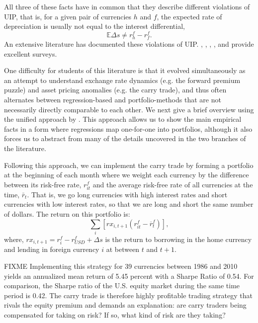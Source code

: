 \documentclass{ar-1col}
\begin{document}
All three of these facts have in common that they describe different violations of UIP, that is, for a given pair of currencies $h$ and $f$, the expected rate of depreciation is usually not equal to the interest differential, $$\mathbb{E}\Delta s \neq r^f_h-r^f_f .$$ An extensive literature has documented these violations of UIP. \citet{Hodrick1987}, \citet{FrootThaler1990}, \citet{Engel1996}, \citet{Lewis2011}, and \citet{Engel2014} provide excellent surveys.

One difficulty for students of this literature is that it evolved simultaneously as an attempt to understand exchange rate dynamics (e.g. the forward premium puzzle) and asset pricing anomalies (e.g. the carry trade), and thus often alternates between regression-based and portfolio-methods that are not necessarily directly comparable to each other. We next give a brief overview using the unified approach by \citet{HassanMano2019}. This approach allows us to show the main empirical facts in a form where regressions map one-for-one into portfolios, although it also forces us to abstract from many of the details uncovered in the two branches of the literature.

Following this approach, we can implement the carry trade by forming a portfolio at the beginning of each month where we weight each currency by the difference between its risk-free rate, $r^f_{it}$ and the average risk-free rate of all currencies at the time, $\bar{r}_t$. That is, we go long currencies with high interest rates and short currencies with low interest rates, so that we are long and short the same number of dollars. The return on this portfolio is:
\begin{equation}
  \label{eq_carry}
  \textstyle\sum_{i}\left[ rx_{i,t+1}\left( r^f_{it}-\overline{r}^f_{t}\right) \right] ,
\end{equation}%
where, $rx_{i,t+1} = r^f_i-r^f_{USD} + \Delta s$ is the return to borrowing in the home currency and lending in foreign currency $i$ at between $t$ and $t+1$.

FIXME Implementing this strategy for 39 currencies between 1986 and 2010 yields an annualized mean return of 5.45 percent with a Sharpe Ratio of 0.54. For comparison, the Sharpe ratio of the U.S. equity market during the same time period is 0.42. The carry trade is therefore highly profitable trading strategy that rivals the equity premium and demands an explanation: are carry traders being compensated for taking on risk? If so, what kind of risk are they taking?
\end{document}
